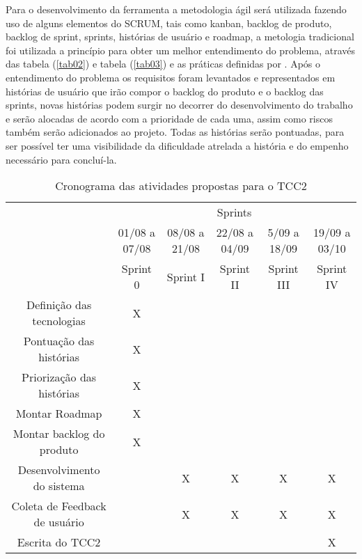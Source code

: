 Para o desenvolvimento da ferramenta a metodologia ágil será utilizada fazendo uso de alguns elementos do SCRUM, tais como kanban, backlog de produto, backlog de sprint, sprints, histórias de usuário e roadmap, a metologia tradicional foi utilizada a princípio para  obter um melhor entendimento do problema, através das tabela (\ref{tab02}) e  tabela (\ref{tab03}) e  as práticas definidas por \cite{pressman2009engenharia}. Após o entendimento do problema os requisitos foram levantados e representados em histórias de usuário que irão compor o backlog do produto e o backlog das sprints, novas histórias podem surgir no decorrer do desenvolvimento do trabalho e serão alocadas de acordo com a prioridade de cada uma, assim como riscos também serão adicionados ao projeto. Todas as histórias serão pontuadas, para ser possível ter uma visibilidade da dificuldade atrelada a história e do empenho necessário para concluí-la. 


\begin{table}[!htpb]
\centering

\begin{small} 
  
\setlength{\tabcolsep}{3pt} 


\begin{tabular}{|c|c|c|c|c|c|}\hline
 & \multicolumn{5}{c|}{Sprints}\\ \cline{2-6}
\raisebox{1.5ex}{Atividades} & 01/08 a 07/08 & 08/08 a 21/08 & 22/08 a 04/09 & 5/09 a 18/09& 19/09 a 03/10 \\ 
 & Sprint 0 & Sprint I & Sprint II & Sprint III & Sprint IV \\ \hline

Definição das tecnologias & X & & & & \\ \hline
Pontuação das histórias & X & & & & \\ \hline
Priorização das histórias & X & & & & \\ \hline
Montar Roadmap & X & & & & \\ \hline
Montar backlog do produto & X & & & &\\ \hline
Desenvolvimento do sistema & & X & X & X & X \\ \hline
Coleta de Feedback de usuário & & X & X & X & X \\ \hline
Escrita do TCC2 & & & & & X \\ \hline


\end{tabular} 
\end{small}
\caption{Cronograma das atividades propostas para o TCC2\label{t_cronograma2}
}
\end{table} 

